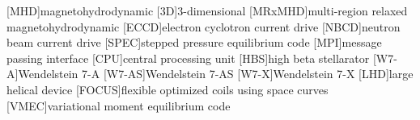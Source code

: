 \begin{acronym}
	
[MHD]{magnetohydrodynamic}
[3D]{3-dimensional}
[MRxMHD]{multi-region relaxed magnetohydrodynamic}
[ECCD]{electron cyclotron current drive}
[NBCD]{neutron beam current drive}
[SPEC]{stepped pressure equilibrium code}
[MPI]{message passing interface}
[CPU]{central processing unit}
[HBS]{high beta stellarator}
[W7-A]{Wendelstein 7-A}
[W7-AS]{Wendelstein 7-AS}
[W7-X]{Wendelstein 7-X}
[LHD]{large helical device}
[FOCUS]{flexible optimized coils using space curves}
[VMEC]{variational moment equilibrium code}

\end{acronym}